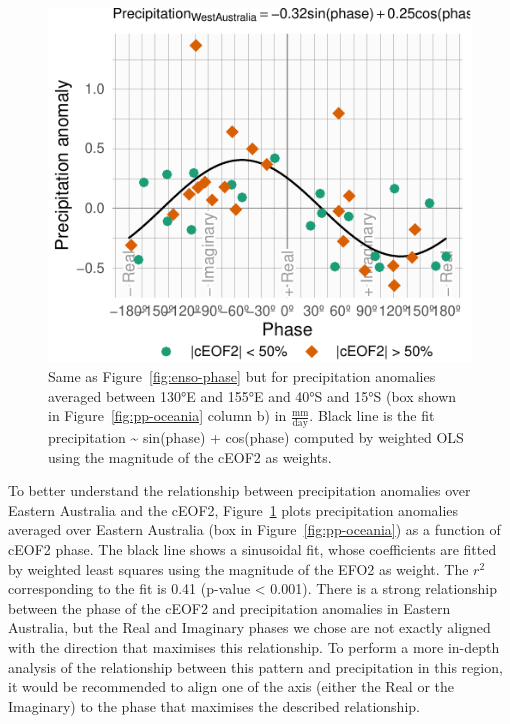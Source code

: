 \documentclass[smallextended]{svjour3}       %
\begin{document}
\begin{figure}
\centering
\includegraphics{../figures/australia-pp-phase-1.pdf}
\caption{\label{fig:australia-pp-phase}Same as Figure~\ref{fig:enso-phase} but for precipitation anomalies averaged between 130°E and 155°E and 40°S and 15°S (box shown in Figure~\ref{fig:pp-oceania} column b) in \(\frac{\mathrm{mm}}{\mathrm{day}}\). Black line is the fit precipitation \textasciitilde{} sin(phase) + cos(phase) computed by weighted OLS using the magnitude of the cEOF2 as weights.}
\end{figure}

To better understand the relationship between precipitation anomalies over Eastern Australia and the cEOF2, Figure~\ref{fig:australia-pp-phase} plots precipitation anomalies averaged over Eastern Australia (box in Figure~\ref{fig:pp-oceania}) as a function of cEOF2 phase.
The black line shows a sinusoidal fit, whose coefficients are fitted by weighted least squares using the magnitude of the EFO2 as weight.
The \(r^2\) corresponding to the fit is 0.41 (p-value \textless{} 0.001).
There is a strong relationship between the phase of the cEOF2 and precipitation anomalies in Eastern Australia, but the Real and Imaginary phases we chose are not exactly aligned with the direction that maximises this relationship.
To perform a more in-depth analysis of the relationship between this pattern and precipitation in this region, it would be recommended to align one of the axis (either the Real or the Imaginary) to the phase that maximises the described relationship.
\end{document}
